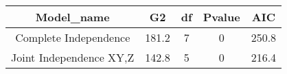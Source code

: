 \documentclass[]{article}
\begin{document}
\begin{longtable}[c]{@{}ccccc@{}}
\toprule
\begin{minipage}[b]{0.37\columnwidth}\centering\strut
Model\_name
\strut\end{minipage} &
\begin{minipage}[b]{0.07\columnwidth}\centering\strut
G2
\strut\end{minipage} &
\begin{minipage}[b]{0.06\columnwidth}\centering\strut
df
\strut\end{minipage} &
\begin{minipage}[b]{0.12\columnwidth}\centering\strut
Pvalue
\strut\end{minipage} &
\begin{minipage}[b]{0.06\columnwidth}\centering\strut
AIC
\strut\end{minipage}\tabularnewline
\midrule
\endhead
\begin{minipage}[t]{0.37\columnwidth}\centering\strut
Complete Independence
\strut\end{minipage} &
\begin{minipage}[t]{0.07\columnwidth}\centering\strut
181.2
\strut\end{minipage} &
\begin{minipage}[t]{0.06\columnwidth}\centering\strut
7
\strut\end{minipage} &
\begin{minipage}[t]{0.12\columnwidth}\centering\strut
0
\strut\end{minipage} &
\begin{minipage}[t]{0.06\columnwidth}\centering\strut
250.8
\strut\end{minipage}\tabularnewline
\begin{minipage}[t]{0.37\columnwidth}\centering\strut
Joint Independence XY,Z
\strut\end{minipage} &
\begin{minipage}[t]{0.07\columnwidth}\centering\strut
142.8
\strut\end{minipage} &
\begin{minipage}[t]{0.06\columnwidth}\centering\strut
5
\strut\end{minipage} &
\begin{minipage}[t]{0.12\columnwidth}\centering\strut
0
\strut\end{minipage} &
\begin{minipage}[t]{0.06\columnwidth}\centering\strut
216.4
\strut\end{minipage}\tabularnewline

\end{longtable}
\end{document}
